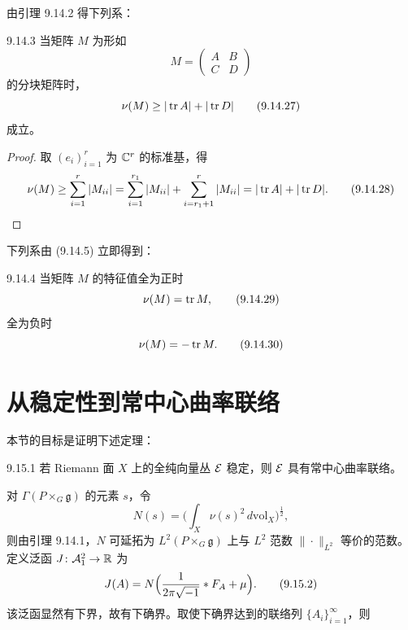 
由引理 9.14.2 得下列系：

\begin{corollary*}{9.14.3}
  当矩阵 $M$ 为形如
  \begin{equation}
    M=\begin{pmatrix}A&B\\C&D\end{pmatrix}
    \tag{9.14.26}
  \end{equation}
  的分块矩阵时，
  \begin{equation}
    \nu(M)\ge|\operatorname{tr} A|+|\operatorname{tr} D|
    \tag{9.14.27}
  \end{equation}
  成立。
\end{corollary*}
\begin{proof}
  取 $(e_i)_{i=1}^r$ 为 $\mathbb{C}^r$ 的标准基，得
  \begin{equation}
    \nu(M)\ge\sum_{i=1}^r|M_{ii}|
    =\sum_{i=1}^{r_1}|M_{ii}|+\sum_{i=r_1+1}^r|M_{ii}|
    =|\operatorname{tr} A|+|\operatorname{tr} D|.
    \tag{9.14.28}
  \end{equation}
\end{proof}

下列系由 (9.14.5) 立即得到：

\begin{lemma}{9.14.4}
  当矩阵 $M$ 的特征值全为正时
  \begin{equation}
    \nu(M)=\operatorname{tr} M,
    \tag{9.14.29}
  \end{equation}
  全为负时
  \begin{equation}
    \nu(M)=-\operatorname{tr} M.
    \tag{9.14.30}
  \end{equation}
\end{lemma}

\section{从稳定性到常中心曲率联络}

本节的目标是证明下述定理：

\begin{theorem}{9.15.1}
  若 Riemann 面 $X$ 上的全纯向量丛 $\mathcal{E}$ 稳定，则 $\mathcal{E}$ 具有常中心曲率联络。
\end{theorem}

对 $\Gamma(P\times_G\mathfrak{g})$ 的元素 $s$，令
\begin{equation}
  N(s)=\biggl(\int_X\nu(s)^2\,d\mathrm{vol}_X\biggr)^{\frac12},
  \tag{9.15.1}
\end{equation}
则由引理 9.14.1，$N$ 可延拓为 $L^2(P\times_G\mathfrak{g})$ 上与 $L^2$ 范数 $\|\cdot\|_{L^2}$ 等价的范数。定义泛函 $J\colon\mathcal{A}^2_1\to\mathbb{R}$ 为
\begin{equation}
  J(A)=N\Bigl(\frac1{2\pi\sqrt{-1}}\ast F_A+\mu\Bigr).
  \tag{9.15.2}
\end{equation}
该泛函显然有下界，故有下确界。取使下确界达到的联络列 $\{A_i\}_{i=1}^\infty$，则

